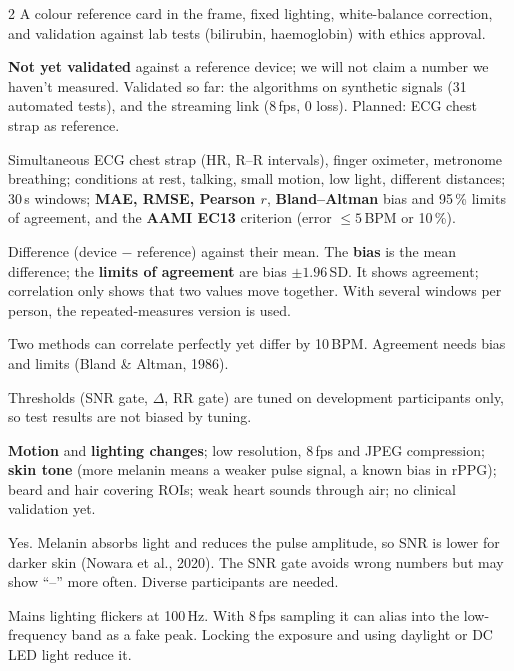 \begin{multicols}{2}
{A colour reference card in the frame, fixed lighting, white-balance correction, and validation against lab tests (bilirubin,
haemoglobin) with ethics approval.}



{\textbf{Not yet validated} against a reference device; we will not claim a number we haven't measured. Validated so far: the
algorithms on synthetic signals (31 automated tests), and the streaming link (8\,fps, 0 loss). Planned: ECG chest strap as
reference.}

{Simultaneous ECG chest strap (HR, R--R intervals), finger oximeter, metronome breathing; conditions at rest, talking, small
motion, low light, different distances; 30\,s windows; \textbf{MAE, RMSE, Pearson $r$}, \textbf{Bland--Altman} bias and 95\,\% limits
of agreement, and the \textbf{AAMI EC13} criterion (error $\leq 5$\,BPM or 10\,\%).}

{Difference (device $-$ reference) against their mean. The \textbf{bias} is the mean difference; the \textbf{limits of agreement}
are bias $\pm1.96$\,SD. It shows agreement; correlation only shows that two values move together. With several windows per
person, the repeated-measures version is used.}

{Two methods can correlate perfectly yet differ by 10\,BPM. Agreement needs bias and limits (Bland \& Altman, 1986).}

{Thresholds (SNR gate, $\Delta$, RR gate) are tuned on development participants only, so test results are not biased by
tuning.}

{\textbf{Motion} and \textbf{lighting changes}; low resolution, 8\,fps and JPEG compression; \textbf{skin tone} (more melanin means a
weaker pulse signal, a known bias in rPPG); beard and hair covering ROIs; weak heart sounds through air; no clinical
validation yet.}

{Yes. Melanin absorbs light and reduces the pulse amplitude, so SNR is lower for darker skin (Nowara et al., 2020). The SNR gate
avoids wrong numbers but may show ``--'' more often. Diverse participants are needed.}

{Mains lighting flickers at 100\,Hz. With 8\,fps sampling it can alias into the low-frequency band as a fake peak. Locking the
exposure and using daylight or DC LED light reduce it.}


\end{multicols}
